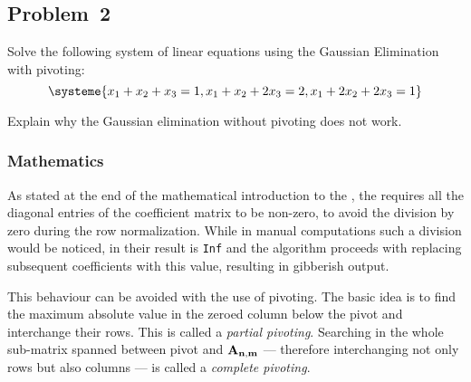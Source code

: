 \subsection{Problem~2}%
\label{problem:2}

Solve the following system of linear equations using the Gaussian Elimination with
pivoting:
\begin{equation*}
    \systeme{x_1+x_2+x_3=1,x_1+x_2+2x_3=2,x_1+2x_2+2x_3=1}
\end{equation*}

Explain why the Gaussian elimination without pivoting does not work.

\subsubsection*{Mathematics}
As stated at the end of the mathematical introduction to the ,
the  requires all the diagonal entries of the coefficient
matrix to be non-zero, to avoid the division by zero during the row normalization.
While in manual computations such a division would be noticed, in \MATLAB their result
is \texttt{Inf} and the algorithm proceeds with replacing subsequent coefficients with
this value, resulting in gibberish output.

This behaviour can be avoided with the use of pivoting. 
The basic idea is to find the maximum absolute value in the zeroed column below the
pivot and interchange their rows.
This is called a \textit{partial pivoting}.
Searching in the whole sub-matrix spanned between pivot and $\mathbf{A_{n,m}}$ ---
therefore interchanging not only rows but also columns --- is called a
\textit{complete pivoting}.


